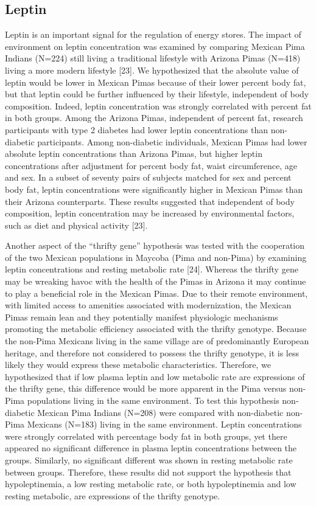 \documentclass[12pt]{article}
\begin{document}
\subsection{Leptin}
Leptin is an important signal for the regulation of energy stores. The impact of environment on leptin concentration was examined by comparing Mexican Pima Indians (N=224) still living a traditional lifestyle with Arizona Pimas (N=418) living a more modern lifestyle [23]. We hypothesized that the absolute value of leptin would be lower in Mexican Pimas because of their lower percent body fat, but that leptin could be further influenced by their lifestyle, independent of body composition. Indeed, leptin concentration was strongly correlated with percent fat in both groups. Among the Arizona Pimas, independent of percent fat, research participants with type 2 diabetes had lower leptin concentrations than non-diabetic participants. Among non-diabetic individuals, Mexican Pimas had lower absolute leptin concentrations than Arizona Pimas, but higher leptin concentrations after adjustment for percent body fat, waist circumference, age and sex. In a subset of seventy pairs of subjects matched for sex and percent body fat, leptin concentrations were significantly higher in Mexican Pimas than their Arizona counterparts. These results suggested that independent of body composition, leptin concentration may be increased by environmental factors, such as diet and physical activity [23].

Another aspect of the “thrifty gene” hypothesis was tested with the cooperation of the two Mexican populations in Maycoba (Pima and non-Pima) by examining leptin concentrations and resting metabolic rate [24]. Whereas the thrifty gene may be wreaking havoc with the health of the Pimas in Arizona it may continue to play a beneficial role in the Mexican Pimas. Due to their remote environment, with limited access to amenities associated with modernization, the Mexican Pimas remain lean and they potentially manifest physiologic mechanisms promoting the metabolic efficiency associated with the thrifty genotype. Because the non-Pima Mexicans living in the same village are of predominantly European heritage, and therefore not considered to possess the thrifty genotype, it is less likely they would express these metabolic characteristics. Therefore, we hypothesized that if low plasma leptin and low metabolic rate are expressions of the thrifty gene, this difference would be more apparent in the Pima versus non-Pima populations living in the same environment. To test this hypothesis non-diabetic Mexican Pima Indians (N=208) were compared with non-diabetic non-Pima Mexicans (N=183) living in the same environment. Leptin concentrations were strongly correlated with percentage body fat in both groups, yet there appeared no significant difference in plasma leptin concentrations between the groups. Similarly, no significant different was shown in resting metabolic rate between groups. Therefore, these results did not support the hypothesis that hypoleptinemia, a low resting metabolic rate, or both hypoleptinemia and low resting metabolic, are expressions of the thrifty genotype.
\end{document}
